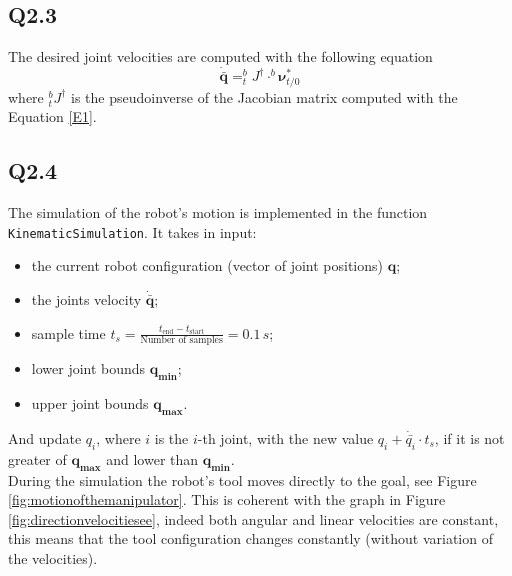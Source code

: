 \subsection{Q2.3}
The desired joint velocities are computed with the following equation
\begin{equation*}
	\dot{\bar{\mathbf{q}}} = ^b_t J ^\dagger \cdot ^b \boldsymbol\nu^*_{t/0}
\end{equation*}
where $^b_t J ^\dagger$ is the pseudoinverse of the Jacobian matrix computed with the Equation \ref{E1}.

\subsection{Q2.4}
The simulation of the robot's motion is implemented in the function \verb*|KinematicSimulation|. It takes in input: 
\begin{itemize}
	\item the current robot configuration (vector of joint positions) $\mathbf{q}$;
	\item the joints velocity $\dot{\bar{\mathbf{q}}}$;
	\item sample time $t_{s} = \frac{t_{\text{end}} - t_{\text{start}}}{\text{Number of samples}} = 0.1 \,s$;
	\item lower joint bounds $\mathbf{q_{\text{min}}}$;
	\item upper joint bounds $\mathbf{q_{\text{max}}}$.
\end{itemize}
And update $q_{i}$, where $i$ is the $i$-th joint, with the new value $q_{i} + \dot{\bar{q_{i}}} \cdot t_{s}$, if it is not greater of $\mathbf{q_{\text{max}}}$ and lower than $\mathbf{q_{\text{min}}}$. \\
During the simulation the robot's tool moves directly to the goal, see Figure \ref{fig:motionofthemanipulator}. This is coherent with the graph in Figure \ref{fig:directionvelocitiesee}, indeed both angular and linear velocities are constant, this means that the tool configuration changes constantly (without variation of the velocities).

